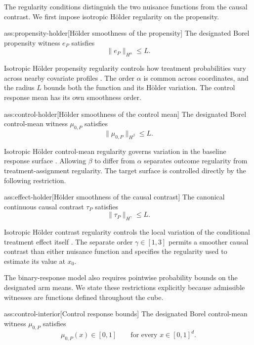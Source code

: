 The regularity conditions distinguish the two nuisance functions from the causal contrast. We first impose isotropic Hölder regularity on the propensity.

\begin{assumptionv}{ass:propensity-holder}[Hölder smoothness of the propensity]
The designated Borel propensity witness \(e_P\) satisfies
\[
\|e_P\|_{H^\alpha}\le L.
\]
\end{assumptionv}

Isotropic Hölder propensity regularity controls how treatment probabilities vary across nearby covariate profiles \citep{KennedyBalakrishnanRobinsWasserman2024}. The order \(\alpha\) is common across coordinates, and the radius \(L\) bounds both the function and its Hölder variation. The control response mean has its own smoothness order.

\begin{assumptionv}{ass:control-holder}[Hölder smoothness of the control mean]
The designated Borel control-mean witness \(\mu_{0,P}\) satisfies
\[
\|\mu_{0,P}\|_{H^\beta}\le L.
\]
\end{assumptionv}

Isotropic Hölder control-mean regularity governs variation in the baseline response surface \citep{KennedyBalakrishnanRobinsWasserman2024}. Allowing \(\beta\) to differ from \(\alpha\) separates outcome regularity from treatment-assignment regularity. The target surface is controlled directly by the following restriction.

\begin{assumptionv}{ass:effect-holder}[Hölder smoothness of the causal contrast]
The canonical continuous causal contrast \(\tau_P\) satisfies
\[
\|\tau_P\|_{H^\gamma}\le L.
\]
\end{assumptionv}

Isotropic Hölder contrast regularity controls the local variation of the conditional treatment effect itself \citep{KennedyBalakrishnanRobinsWasserman2024}. The separate order \(\gamma\in[1,3]\) permits a smoother causal contrast than either nuisance function and specifies the regularity used to estimate its value at \(x_0\).

The binary-response model also requires pointwise probability bounds on the designated arm means. We state these restrictions explicitly because admissible witnesses are functions defined throughout the cube.

\begin{assumptionv}{ass:control-interior}[Control response bounds]
The designated Borel control-mean witness \(\mu_{0,P}\) satisfies
\[
\mu_{0,P}(x)\in[0,1]
\qquad\text{for every }x\in[0,1]^d.
\]
\end{assumptionv}

